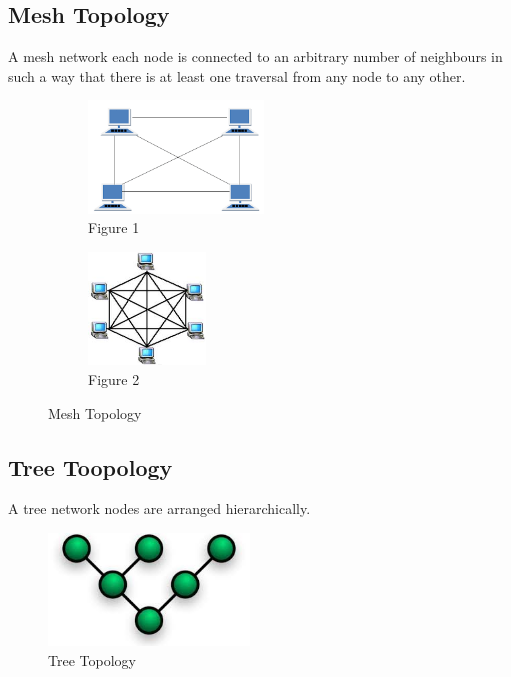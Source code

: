 \documentclass{article}
\begin{document}
\subsection{Mesh Topology}
A mesh network each node is connected to an arbitrary number of neighbours in such a way that there is at least one traversal from any node to any other.
\begin{figure}[h]
\begin{subfigure}{0.5\textwidth}
\includegraphics[width=0.6\linewidth, height=3cm]{mesh.jpg}
\caption*{Figure 1}
\end{subfigure}
\begin{subfigure}{0.5\textwidth}
\includegraphics[width=0.6\linewidth, height=3cm]{mesh2.jpg}
\caption*{Figure 2}
\end{subfigure}
\caption*{Mesh Topology}
\end{figure}
\subsection{Tree Toopology}
A tree network nodes are arranged hierarchically.
\begin{figure}[h]
\includegraphics[width=0.9\linewidth, height=3cm]{tree.jpg}
\caption*{Tree Topology}
\end{figure}
\newpage
\end{document}
